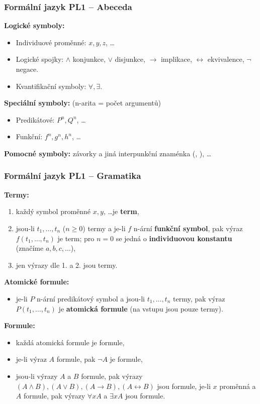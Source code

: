 \subsubsection{Formální jazyk PL1 -- Abeceda}
\textbf{Logické symboly:}
\begin{itemize}
\item Individuové proměnné: $x, y, z$, \ldots
\item Logické spojky:  $\land$ konjunkce, $\lor$ disjunkce, $ \rightarrow $ implikace,  $ \leftrightarrow $ ekvivalence, $ \lnot $ negace.
\item Kvantifikační symboly: $\forall, \exists$.
\end{itemize}

\noindent\textbf{Speciální symboly:} (n-arita = počet argumentů)
\begin{itemize}
\item Predikátové: $P^n, Q^n$, \ldots
\item Funkční: $f^n, g^n, h^n$, \ldots
\end{itemize}

\noindent\textbf{Pomocné symboly:} závorky a jiná interpunkční znaménka (, ), \ldots

\subsubsection{Formální jazyk PL1 -- Gramatika}
\textbf{Termy:}
\begin{enumerate}
\item každý symbol proměnné $x, y$, \ldots je \textbf{term},
\item jsou-li $ t_1, \ldots, t_n $ ($n \geq 0$) termy a je-li $f$ n-ární \textbf{funkční symbol}, pak výraz $f(t_1, \ldots, t_n)$ je term; pro $n = 0$ se jedná o \textbf{individuovou konstantu} (značíme $a, b, c, \ldots$),
\item jen výrazy dle 1. a 2. jsou termy.
\end{enumerate}

\noindent\textbf{Atomické formule:}
\begin{itemize}
\item je-li $ P $ n-ární predikátový symbol a jsou-li $ t_1, \ldots, t_n $ termy, pak výraz $ P(t_1, \ldots, t_n) $ je \textbf{atomická formule} (na vstupu jsou pouze termy).
\end{itemize}

\noindent\textbf{Formule:}
\begin{itemize}
\item každá atomická formule je formule,
\item je-li výraz $ A $ formule, pak $\neg A$ je formule,
\item jsou-li výrazy $A$ a $B$ formule, pak výrazy $(A \land B), (A \lor B), (A \rightarrow B), (A \leftrightarrow B)$ jsou formule, je-li $ x $ proměnná a $A$ formule, pak výrazy $\forall x A$ a $\exists x A$ jsou formule.
\end{itemize}

